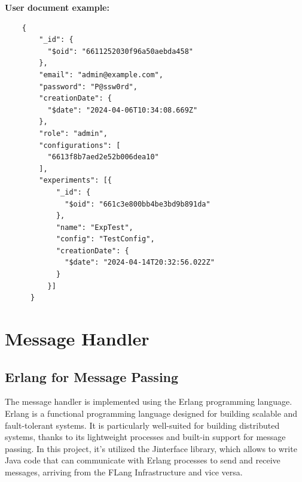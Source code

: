 \textbf{User document example:} \begin{verbatim}
    {
        "_id": {
          "$oid": "6611252030f96a50aebda458"
        },
        "email": "admin@example.com",
        "password": "P@ssw0rd",
        "creationDate": {
          "$date": "2024-04-06T10:34:08.669Z"
        },
        "role": "admin",
        "configurations": [
          "6613f8b7aed2e52b006dea10"
        ],
        "experiments": [{
            "_id": {
              "$oid": "661c3e800bb4be3bd9b891da"
            },
            "name": "ExpTest",
            "config": "TestConfig",
            "creationDate": {
              "$date": "2024-04-14T20:32:56.022Z"
            }
          }]
      }

    \end{verbatim}
\newpage
\section{Message Handler}

\subsection{Erlang for Message Passing}
The message handler is implemented using the Erlang programming language. Erlang is a functional programming language designed for building scalable and fault-tolerant systems. It is particularly well-suited for building distributed systems, thanks to its lightweight processes and built-in support for message passing. In this project, it's utilized the Jinterface library, which allows to write Java code that can communicate with Erlang processes to send and receive messages, arriving from the FLang Infrastructure and vice versa.

